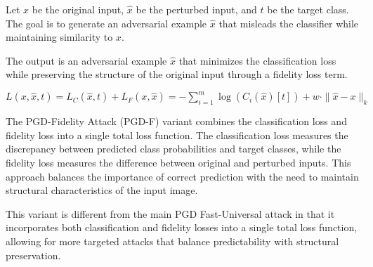 Let \( x \) be the original input, \( \hat{x} \) be the perturbed input, and \( t \) be the target class. The goal is to generate an adversarial example \( \hat{x} \) that misleads the classifier while maintaining similarity to \( x \).

The output is an adversarial example \( \hat{x} \) that minimizes the classification loss while preserving the structure of the original input through a fidelity loss term.

$L(x, \hat{x}, t) = L_C(\hat{x}, t) + L_F(x, \hat{x}) = -\sum_{i=1}^{m} \log(C_i(\hat{x})[t]) + w \cdot \| \hat{x} - x \|_k$

The PGD-Fidelity Attack (PGD-F) variant combines the classification loss and fidelity loss into a single total loss function. The classification loss measures the discrepancy between predicted class probabilities and target classes, while the fidelity loss measures the difference between original and perturbed inputs. This approach balances the importance of correct prediction with the need to maintain structural characteristics of the input image.

This variant is different from the main PGD Fast-Universal attack in that it incorporates both classification and fidelity losses into a single total loss function, allowing for more targeted attacks that balance predictability with structural preservation.
